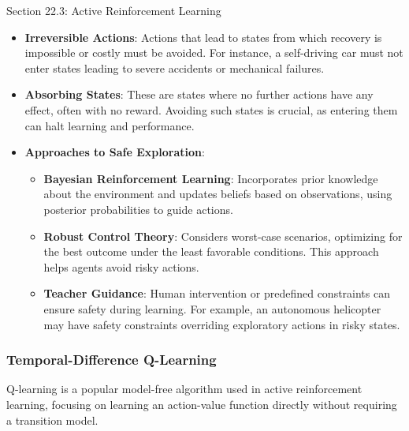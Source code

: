 \begin{notes}{Section 22.3: Active Reinforcement Learning}
\begin{highlight}
        \begin{itemize}
            \item \textbf{Irreversible Actions}: Actions that lead to states from which recovery is impossible or costly must be avoided. For instance, a self-driving car must not enter states leading to 
            severe accidents or mechanical failures.
            \item \textbf{Absorbing States}: These are states where no further actions have any effect, often with no reward. Avoiding such states is crucial, as entering them can halt learning and 
            performance.
            \item \textbf{Approaches to Safe Exploration}:
                \begin{itemize}
                    \item \textbf{Bayesian Reinforcement Learning}: Incorporates prior knowledge about the environment and updates beliefs based on observations, using posterior probabilities to guide 
                    actions.
                    \item \textbf{Robust Control Theory}: Considers worst-case scenarios, optimizing for the best outcome under the least favorable conditions. This approach helps agents avoid risky actions.
                    \item \textbf{Teacher Guidance}: Human intervention or predefined constraints can ensure safety during learning. For example, an autonomous helicopter may have safety constraints 
                    overriding exploratory actions in risky states.
                \end{itemize}
        \end{itemize}
    
    \end{highlight}
    
    \subsubsection*{Temporal-Difference Q-Learning}
    
    Q-learning is a popular model-free algorithm used in active reinforcement learning, focusing on learning an action-value function directly without requiring a transition model.
    
    \begin{highlight}
    

\end{highlight}
\end{notes}
